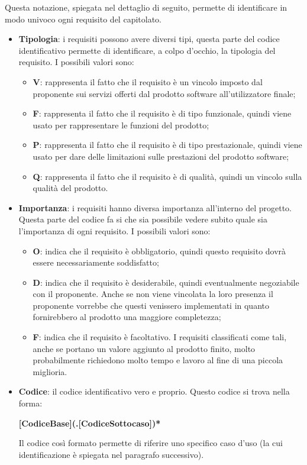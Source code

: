 \documentclass[../norme_di_progetto.tex]{subfiles}
\begin{document}
Questa notazione, spiegata nel dettaglio di seguito, permette di identificare in modo univoco ogni requisito del capitolato.
\begin{itemize}
    \item \textbf{Tipologia}: i requisiti possono avere diversi tipi, questa parte del codice identificativo permette di identificare, a colpo d'occhio, la tipologia del requisito. I possibili valori sono:
    \begin{itemize}
        \item \textbf{V}: rappresenta il fatto che il requisito è un vincolo imposto dal proponente sui servizi offerti dal prodotto software all'utilizzatore finale;
        \item \textbf{F}: rappresenta il fatto che il requisito è di tipo funzionale, quindi viene usato per rappresentare le funzioni del prodotto;
        \item \textbf{P}: rappresenta il fatto che il requisito è di tipo prestazionale, quindi viene usato per dare delle limitazioni sulle prestazioni del prodotto software;
        \item \textbf{Q}: rappresenta il fatto che il requisito è di qualità, quindi un vincolo sulla qualità del prodotto.
    \end{itemize}
    
    \item \textbf{Importanza}: i requisiti hanno diversa importanza all'interno del progetto. Questa parte del codice fa si che sia possibile vedere subito quale sia l'importanza di ogni requisito. I possibili valori sono:
    \begin{itemize}
        \item \textbf{O}: indica che il requisito è obbligatorio, quindi questo requisito dovrà essere necessariamente soddisfatto;
        \item \textbf{D}: indica che il requisito è desiderabile, quindi eventualmente negoziabile con il proponente. Anche se non viene vincolata la loro presenza il proponente vorrebbe che questi venissero implementati in quanto fornirebbero al prodotto una maggiore completezza;
        \item \textbf{F}: indica che il requisito è facoltativo. I requisiti classificati come tali, anche se portano un valore aggiunto al prodotto finito, molto probabilmente richiedono molto tempo e lavoro al fine di una piccola miglioria.
    \end{itemize}
    
    \item \textbf{Codice}: il codice identificativo vero e proprio. Questo codice si trova nella forma:
    \begin{center}
        \textbf{[CodiceBase](.[CodiceSottocaso])*}
    \end{center}
    Il codice così formato permette di riferire uno specifico caso d'uso (la cui identificazione è spiegata nel paragrafo successivo).
\end{itemize}
\end{document}
